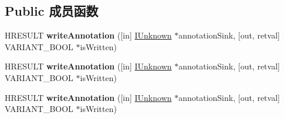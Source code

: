 \subsection*{Public 成员函数}
\begin{DoxyCompactItemize}
\item 
\mbox{\label{interface_m_s_x_m_l2_1_1_i_schema_item_abe97be73a633a62df910840f28ba2441}} 
H\+R\+E\+S\+U\+LT {\bfseries write\+Annotation} (\mbox{[}in\mbox{]} \hyperlink{interface_i_unknown}{I\+Unknown} $\ast$annotation\+Sink, \mbox{[}out, retval\mbox{]} V\+A\+R\+I\+A\+N\+T\+\_\+\+B\+O\+OL $\ast$is\+Written)
\item 
\mbox{\label{interface_m_s_x_m_l2_1_1_i_schema_item_abe97be73a633a62df910840f28ba2441}} 
H\+R\+E\+S\+U\+LT {\bfseries write\+Annotation} (\mbox{[}in\mbox{]} \hyperlink{interface_i_unknown}{I\+Unknown} $\ast$annotation\+Sink, \mbox{[}out, retval\mbox{]} V\+A\+R\+I\+A\+N\+T\+\_\+\+B\+O\+OL $\ast$is\+Written)
\item 
\mbox{\label{interface_m_s_x_m_l2_1_1_i_schema_item_abe97be73a633a62df910840f28ba2441}} 
H\+R\+E\+S\+U\+LT {\bfseries write\+Annotation} (\mbox{[}in\mbox{]} \hyperlink{interface_i_unknown}{I\+Unknown} $\ast$annotation\+Sink, \mbox{[}out, retval\mbox{]} V\+A\+R\+I\+A\+N\+T\+\_\+\+B\+O\+OL $\ast$is\+Written)
\end{DoxyCompactItemize}
